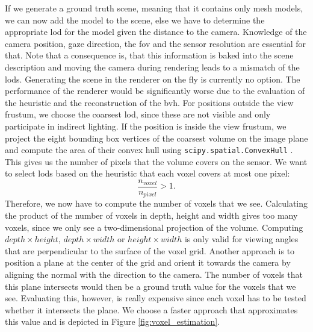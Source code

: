 If we generate a ground truth scene, meaning that it contains only mesh models, we can now add the model to the scene, else we have to determine the appropriate \ac{lod} for the model given the distance to the camera.
Knowledge of the camera position, gaze direction, the \ac{fov} and the sensor resolution are essential for that.
Note that a consequence is, that this information is baked into the scene description and moving the camera during rendering leads to a mismatch of the \acp{lod}.
Generating the scene in the renderer on the fly is currently no option.
The performance of the renderer would be significantly worse due to the evaluation of the heuristic and the reconstruction of the \ac{bvh}.
For positions outside the view frustum, we choose the coarsest \ac{lod}, since these are not visible and only participate in indirect lighting.
If the position is inside the view frustum, we project the eight bounding box vertices of the coarsest volume on the image plane and compute the area of their convex hull using \texttt{scipy.spatial.ConvexHull} \cite{scipy}.
This gives us the number of pixels that the volume covers on the sensor.
We want to select \acp{lod} based on the heuristic that each voxel covers at most one pixel:
\begin{equation*}
    \frac{n_{voxel}}{n_{pixel}} > 1.
\end{equation*}
Therefore, we now have to compute the number of voxels that we see.
Calculating the product of the number of voxels in depth, height and width gives too many voxels, since we only see a two-dimensional projection of the volume.
Computing $depth \times height$, $depth \times width$ or $height \times width$ is only valid for viewing angles that are perpendicular to the surface of the voxel grid.
Another approach is to position a plane at the center of the grid and orient it towards the camera by aligning the normal with the direction to the camera.
The number of voxels that this plane intersects would then be a ground truth value for the voxels that we see.
Evaluating this, however, is really expensive since each voxel has to be tested whether it intersects the plane.
We choose a faster approach that approximates this value and is depicted in Figure \ref{fig:voxel_estimation}.
